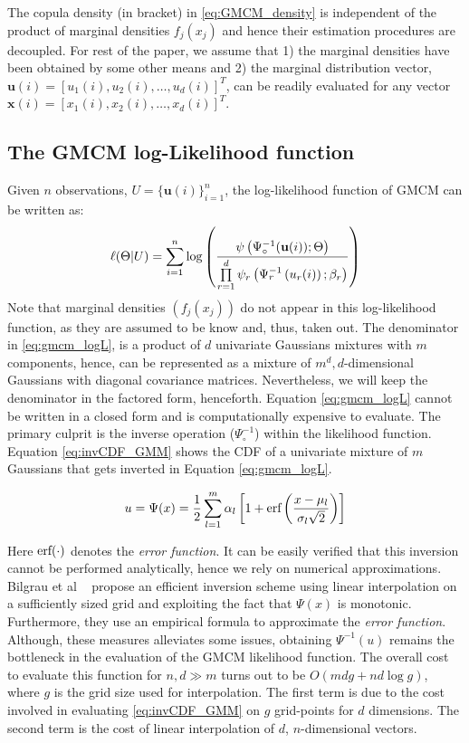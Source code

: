 \documentclass[]{article}
\begin{document}
The copula density (in bracket) in \eqref{eq:GMCM_density} is independent of the product of marginal densities $f_j(x_j)$ and hence their estimation procedures are decoupled. For rest of the paper, we assume that 1) the marginal densities have been obtained by some other means and 2) the marginal distribution vector, $ \textbf{u}(i) =[u_1(i), u_2(i), \ldots , u_d(i)]^T$, can be readily evaluated for any vector $\textbf{x}(i) =[x_1(i), x_2(i), \ldots , x_d(i)]^T$. 


\subsection{The GMCM log-Likelihood function}\label{subsec:GMCM_likelihood}
Given $n$ observations, $U=\{ \textbf{u}(i)\}_{i=1}^n$, the log-likelihood function of GMCM can be written as:
\begin{equation}\label{eq:gmcm_logL}
\ell(\Theta |U)=\sum\limits_{i=1}^{n} \log \left( \frac{\psi\left(\Psi_{\circ}^{-1}(\textbf{u}(i));\Theta\right)}{\native_llDenom{(i)}} \right) 
\end{equation} 
Note that marginal densities $\left(f_j(x_j)\right)$ do not appear in this log-likelihood function, as they are assumed to be know and, thus, taken out. The denominator in \eqref{eq:gmcm_logL}, is a product of $d$ univariate Gaussians mixtures with $m$ components, hence, can be represented as a mixture of $m^d, d$-dimensional Gaussians with diagonal covariance matrices. Nevertheless, we will keep the denominator in the factored form, henceforth. Equation \ref{eq:gmcm_logL} cannot be written in a closed form and is computationally expensive to evaluate. The primary culprit is the inverse operation ($\Psi_{\circ}^{-1}$) within the likelihood function. Equation \ref{eq:invCDF_GMM}  shows the CDF of  a univariate mixture of $m$ Gaussians that gets inverted in Equation \ref{eq:gmcm_logL}.
 
 \begin{equation} \label{eq:invCDF_GMM}
 u=\Psi(x)= \frac{1}{2}\sum\limits_{l=1}^{m} \alpha_l \left[1 + \textmd{erf}\left( \frac{x-\mu_l}{\sigma_l\sqrt{2}}\right) \right] 
 \end{equation} 
 
 Here $\textmd{erf}(\cdot)$ denotes the \emph{error function}. It can be easily verified that this inversion cannot be performed analytically, hence we rely on numerical approximations. Bilgrau et al ~\cite{Bilgrau2015} propose an efficient inversion scheme using linear interpolation on a sufficiently sized grid and exploiting the fact that $\Psi(x)$ is monotonic. Furthermore, they use an empirical formula to approximate the \emph{error function}. Although, these measures alleviates some issues, obtaining $\Psi^{-1}(u)$ remains the bottleneck in the evaluation of the GMCM likelihood function. The overall cost to evaluate this function for $n,d \gg m$ turns out to be $O(mdg + nd\log{g})$, where $g$ is the grid size used for interpolation. The first term is due to the cost involved in evaluating \eqref{eq:invCDF_GMM} on $g$ grid-points for $d$ dimensions. The second term is the cost of linear interpolation of $d$, $n$-dimensional vectors.   
\end{document}
